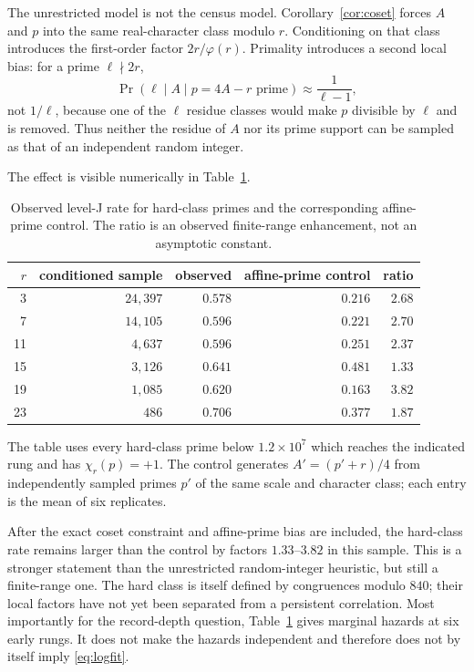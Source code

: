 \documentclass[11pt]{article}
\theoremstyle{definition}
\theoremstyle{remark}
\begin{document}
The unrestricted model is not the census model. Corollary~\ref{cor:coset} forces
$A$ and $p$ into the same real-character class modulo $r$. Conditioning on that class
introduces the first-order factor $2r/\varphi(r)$. Primality introduces a second local
bias: for a prime $\ell\nmid2r$,
\begin{equation}\label{eq:affine-prime-bias}
\Pr\left(\ell\mid A\mid p=4A-r\text{ prime}\right)
\approx\frac1{\ell-1},
\end{equation}
not $1/\ell$, because one of the $\ell$ residue classes would make $p$ divisible by
$\ell$ and is removed. Thus neither the residue of $A$ nor its prime support can be
sampled as that of an independent random integer.

The effect is visible numerically in Table~\ref{tab:hazard-control}.

\begin{table}[ht]\centering
\caption{Observed level-J rate for hard-class primes and the corresponding
affine-prime control. The ratio is an observed finite-range enhancement, not an
asymptotic constant.}\label{tab:hazard-control}
\begin{tabular}{rrrrr}
\toprule
$r$ & conditioned sample & observed & affine-prime control & ratio \\
\midrule
3  & $24{,}397$ & $0.578$ & $0.216$ & $2.68$ \\
7  & $14{,}105$ & $0.596$ & $0.221$ & $2.70$ \\
11 &  $4{,}637$ & $0.596$ & $0.251$ & $2.37$ \\
15 &  $3{,}126$ & $0.641$ & $0.481$ & $1.33$ \\
19 &  $1{,}085$ & $0.620$ & $0.163$ & $3.82$ \\
23 &      $486$ & $0.706$ & $0.377$ & $1.87$ \\
\bottomrule
\end{tabular}
\end{table}

The table uses every hard-class prime below $1.2\times10^7$ which reaches the indicated
rung and has $\chi_r(p)=+1$. The control generates $A'=(p'+r)/4$ from independently
sampled primes $p'$ of the same scale and character class; each entry is the mean of
six replicates.

After the exact coset constraint and affine-prime bias are included, the hard-class
rate remains larger than the control by factors $1.33$--$3.82$ in this sample. This is
a stronger statement than the unrestricted random-integer heuristic, but still a
finite-range one. The hard class is itself defined by congruences modulo $840$; their
local factors have not yet been separated from a persistent correlation. Most
importantly for the record-depth question, Table~\ref{tab:hazard-control} gives marginal
hazards at six early rungs. It does not make the hazards independent and therefore does
not by itself imply \eqref{eq:logfit}.
\end{document}

